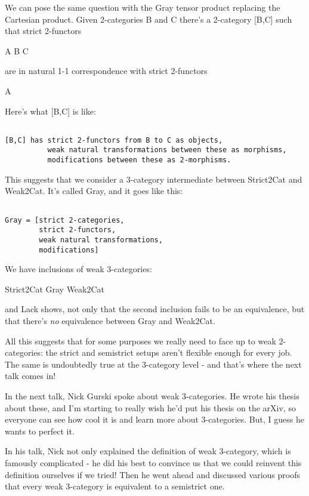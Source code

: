 We can pose the same question with the Gray tensor product replacing
the Cartesian product.  Given 2-categories B and C there's a 
2-category [B,C] such that strict 2-functors

A \otimes  B \to  C

are in natural 1-1 correspondence with strict 2-functors

A \to  [B,C]

Here's what [B,C] is like:


\begin{verbatim}

[B,C] has strict 2-functors from B to C as objects,
          weak natural transformations between these as morphisms, 
          modifications between these as 2-morphisms.
\end{verbatim}
    
This suggests that we consider a 3-category intermediate between
Strict2Cat and Weak2Cat.   It's called Gray, and it goes like this:


\begin{verbatim}

Gray = [strict 2-categories, 
        strict 2-functors, 
        weak natural transformations,
        modifications]
\end{verbatim}
    
We have inclusions of weak 3-categories:

Strict2Cat \to  Gray \to  Weak2Cat

and Lack shows, not only that the second inclusion fails to be an
equivalence, but that there's \emph{no} equivalence between Gray and
Weak2Cat.

All this suggests that for some purposes we really need to face up
to weak 2-categories: the strict and semistrict setups aren't flexible
enough for every job.  The same is undoubtedly true at the 3-category
level - and that's where the next talk comes in!

In the next talk, Nick Gurski spoke about weak 3-categories.  He wrote
his thesis about these, and I'm starting to really wish he'd put his
thesis on the arXiv, so everyone can see how cool it is and learn more
about 3-categories.  But, I guess he wants to perfect it.  

In his talk, Nick not only explained the definition of weak
3-category, which is famously complicated - he did his best to
convince us that we could reinvent this definition ourselves if we
tried!  Then he went ahead and discussed various proofs that every
weak 3-category is equivalent to a semistrict one.

